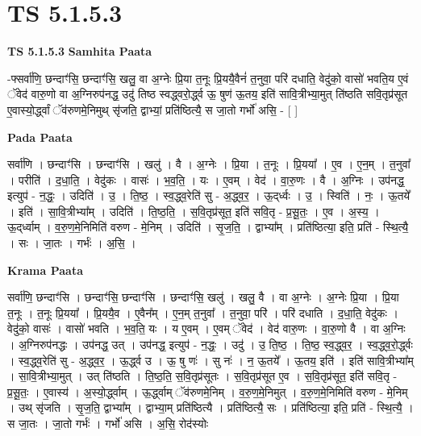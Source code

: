 \documentclass[17pt]{extarticle}
\begin{document}
\section{ TS 5.1.5.3 }

\textbf{TS 5.1.5.3 } \newline
\textbf{Samhita Paata} \newline

-फ्सर्वा॑णि॒ छन्दाꣳ॑सि॒ छन्दाꣳ॑सि॒ खलु॒ वा अ॒ग्नेः प्रि॒या त॒नूः प्रि॒ययै॒वैनं॑ त॒नुवा॒ परि॑ दधाति॒ वेदु॑को॒ वासो॑ भवति॒य ए॒वं ॅवेद॑ वारु॒णो वा अ॒ग्निरुप॑नद्ध॒ उदु॑ तिष्ठ स्वद्ध्वरो॒र्द्ध्व ऊ॒ षुण॑ ऊ॒तय॒ इति॑ सावि॒त्रीभ्या॒मुत् ति॑ष्ठति सवि॒तृप्र॑सूत ए॒वास्यो॒र्द्ध्वां ॅव॑रुणमे॒निमुथ् सृ॑जति॒ द्वाभ्यां॒ प्रति॑ष्ठित्यै॒ स जा॒तो गर्भो॑ असि॒ - [  ] \newline

\textbf{Pada Paata} \newline

सर्वा॑णि । छन्दाꣳ॑सि । छन्दाꣳ॑सि । खलु॑ । वै । अ॒ग्नेः । प्रि॒या । त॒नूः । प्रि॒यया᳚ । ए॒व । ए॒न॒म् । त॒नुवा᳚ । परीति॑ । द॒धा॒ति॒ । वेदु॑कः । वासः॑ । भ॒व॒ति॒ । यः । ए॒वम् । वेद॑ । वा॒रु॒णः । वै । अ॒ग्निः । उप॑नद्ध॒ इत्युप॑ - न॒द्धः॒ । उदिति॑ । उ॒ । ति॒ष्ठ॒ । स्व॒द्ध्व॒रेति॑ सु - अ॒द्ध्व॒र॒ । ऊ॒द्‌र्ध्वः । उ॒ । स्विति॑ । नः॒ । ऊ॒तये᳚ । इति॑ । सा॒वि॒त्रीभ्या᳚म् । उदिति॑ । ति॒ष्ठ॒ति॒ । स॒वि॒तृप्र॑सूत॒ इति॑ सवि॒तृ - प्र॒सू॒तः॒ । ए॒व । अ॒स्य॒ । ऊ॒द्‌र्ध्वाम् । व॒रु॒ण॒मे॒निमिति॑ वरुण - मे॒निम् । उदिति॑ । सृ॒ज॒ति॒ । द्वाभ्या᳚म् । प्रति॑ष्ठित्या॒ इति॒ प्रति॑ - स्थि॒त्यै॒ । सः । जा॒तः । गर्भः॑ । अ॒सि॒ ।  \newline


\textbf{Krama Paata} \newline

सर्वा॑णि॒ छन्दाꣳ॑सि । छन्दाꣳ॑सि॒ छन्दाꣳ॑सि । छन्दाꣳ॑सि॒ खलु॑ । खलु॒ वै । वा अ॒ग्नेः । अ॒ग्नेः प्रि॒या । प्रि॒या त॒नूः । त॒नूः प्रि॒यया᳚ । प्रि॒ययै॒व । ए॒वैन᳚म् । ए॒न॒म् त॒नुवा᳚ । त॒नुवा॒ परि॑ । परि॑ दधाति । द॒धा॒ति॒ वेदु॑कः । वेदु॑को॒ वासः॑ । वासो॑ भवति । भ॒व॒ति॒ यः । य ए॒वम् । ए॒वम् ॅवेद॑ । वेद॑ वारु॒णः । वा॒रु॒णो वै । वा अ॒ग्निः । अ॒ग्निरुप॑नद्धः । उप॑नद्ध॒ उत् । उप॑नद्ध॒ इत्युप॑ - न॒द्धः॒ । उदु॑ । उ॒ ति॒ष्ठ॒ । ति॒ष्ठ॒ स्व॒द्ध्व॒र॒ । स्व॒द्ध्व॒रो॒र्द्ध्वः । स्व॒द्ध्व॒रेति॑ सु - अ॒द्ध्व॒र॒ । ऊ॒र्द्ध्व उ । ऊ॒ षु णः॑ । सु नः॑ । न॒ ऊ॒तये᳚ । ऊ॒तय॒ इति॑ । इति॑ सावि॒त्रीभ्या᳚म् । सा॒वि॒त्रीभ्या॒मुत् । उत् ति॑ष्ठति । ति॒ष्ठ॒ति॒ स॒वि॒तृप्र॑सूतः । स॒वि॒तृप्र॑सूत ए॒व । स॒वि॒तृप्र॑सूत॒ इति॑ सवि॒तृ - प्र॒सू॒तः॒ । ए॒वास्य॑ । अ॒स्यो॒र्द्ध्वाम् । ऊ॒र्द्ध्वाम् ॅव॑रुणमे॒निम् । व॒रु॒ण॒मे॒निमुत् । व॒रु॒ण॒मे॒निमिति॑ वरुण - मे॒निम् । उथ् सृ॑जति । सृ॒ज॒ति॒ द्वाभ्या᳚म् । द्वाभ्या॒म् प्रति॑ष्ठित्यै । प्रति॑ष्ठित्यै॒ सः । प्रति॑ष्ठित्या॒ इति॒ प्रति॑ - स्थि॒त्यै॒ । स जा॒तः । जा॒तो गर्भः॑ । गर्भो॑ असि । अ॒सि॒ रोद॑स्योः \newline
\end{document}
